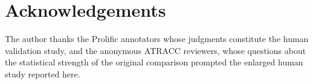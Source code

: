 \documentclass[letterpaper]{article}
\begin{document}
\section{Acknowledgements}

The author thanks the Prolific annotators whose judgments constitute the human
validation study, and the anonymous ATRACC reviewers, whose questions about the
statistical strength of the original comparison prompted the enlarged human
study reported here.


\end{document}
